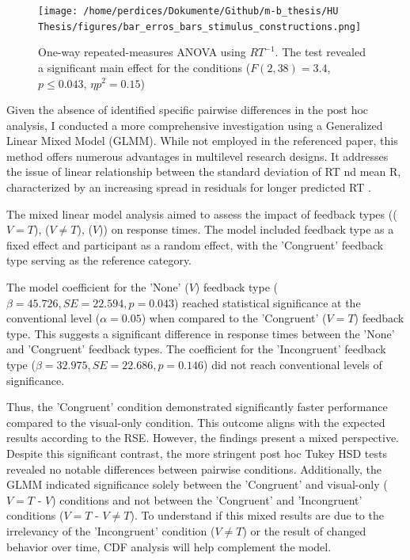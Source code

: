 \documentclass[12pt,oneside,openright]{report}
\begin{document}
\begin{figure}[!ht]
    \centering
    \texttt{[image: /home/perdices/Dokumente/Github/m-b\_thesis/HU Thesis/figures/bar\_erros\_bars\_stimulus\_constructions.png]}
    \caption{One-way repeated-measures ANOVA using $RT^{-1}$. The test revealed a significant main effect for the conditions ($F(2,38) = 3.4$, $p \leq 0.043$, $\eta p^2 = 0.15$)}
    \label{fig:error}
\end{figure}

Given the absence of identified specific pairwise differences in the post hoc analysis, I conducted a more comprehensive investigation using a Generalized Linear Mixed Model (GLMM). While not employed in the referenced paper, this method offers numerous advantages in multilevel research designs. It addresses the issue of linear relationship between the standard deviation of RT nd mean R, characterized by an increasing spread in residuals for longer predicted RT  \parencite{Lo2015-fv}.

The mixed linear model analysis aimed to assess the impact of feedback types (($V=T$), ($V \neq T$), ($V$)) on response times. The model included feedback type as a fixed effect and participant as a random effect, with the 'Congruent' feedback type serving as the reference category.

The model coefficient for the 'None' ($V$) feedback type ($\beta = 45.726, SE = 22.594, p = 0.043$) reached statistical significance at the conventional level ($\alpha =0.05 $) when compared to the 'Congruent' ($V=T$) feedback type. This suggests a significant difference in response times between the 'None' and 'Congruent' feedback types. The coefficient for the 'Incongruent' feedback type ($\beta = 32.975, SE = 22.686, p = 0.146$) did not reach conventional levels of significance.

Thus, the 'Congruent' condition demonstrated significantly faster performance compared to the visual-only condition. This outcome aligns with the expected results according to the RSE. However, the findings present a mixed perspective. Despite this significant contrast, the more stringent post hoc Tukey HSD tests revealed no notable differences between pairwise conditions. Additionally, the GLMM indicated significance solely between the 'Congruent' and visual-only ($V=T$ - $V$) conditions and not between the 'Congruent' and 'Incongruent' conditions ($V=T$ - $V \neq T$). To understand if this mixed results are due to the irrelevancy of the 'Incongruent' condition ($V \neq T$) or the result of changed behavior over time, CDF analysis will help complement the model.
\end{document}
